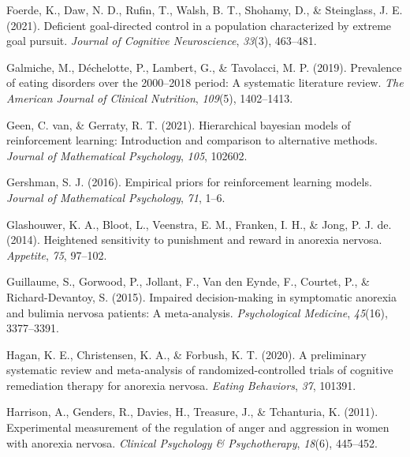 \documentclass[
  man,floatsintext]{apa6}
\newlength{\cslhangindent}
\newlength{\cslentryspacingunit} %
\newenvironment{CSLReferences}[2] %
 {%
  \setlength{\parindent}{0pt}
  \ifodd #1
  \let\oldpar\par
  \def\par{\hangindent=\cslhangindent\oldpar}
  \fi
  \setlength{\parskip}{#2\cslentryspacingunit}
 }%
 {}
\begin{document}
\begin{CSLReferences}{1}{0}
\leavevmode{}%
Foerde, K., Daw, N. D., Rufin, T., Walsh, B. T., Shohamy, D., \& Steinglass, J. E. (2021). Deficient goal-directed control in a population characterized by extreme goal pursuit. \emph{Journal of Cognitive Neuroscience}, \emph{33}(3), 463--481.

\leavevmode{}%
Galmiche, M., Déchelotte, P., Lambert, G., \& Tavolacci, M. P. (2019). Prevalence of eating disorders over the 2000--2018 period: A systematic literature review. \emph{The American Journal of Clinical Nutrition}, \emph{109}(5), 1402--1413.

\leavevmode{}%
Geen, C. van, \& Gerraty, R. T. (2021). Hierarchical bayesian models of reinforcement learning: Introduction and comparison to alternative methods. \emph{Journal of Mathematical Psychology}, \emph{105}, 102602.

\leavevmode{}%
Gershman, S. J. (2016). Empirical priors for reinforcement learning models. \emph{Journal of Mathematical Psychology}, \emph{71}, 1--6.

\leavevmode{}%
Glashouwer, K. A., Bloot, L., Veenstra, E. M., Franken, I. H., \& Jong, P. J. de. (2014). Heightened sensitivity to punishment and reward in anorexia nervosa. \emph{Appetite}, \emph{75}, 97--102.

\leavevmode{}%
Guillaume, S., Gorwood, P., Jollant, F., Van den Eynde, F., Courtet, P., \& Richard-Devantoy, S. (2015). Impaired decision-making in symptomatic anorexia and bulimia nervosa patients: A meta-analysis. \emph{Psychological Medicine}, \emph{45}(16), 3377--3391.

\leavevmode{}%
Hagan, K. E., Christensen, K. A., \& Forbush, K. T. (2020). A preliminary systematic review and meta-analysis of randomized-controlled trials of cognitive remediation therapy for anorexia nervosa. \emph{Eating Behaviors}, \emph{37}, 101391.

\leavevmode{}%
Harrison, A., Genders, R., Davies, H., Treasure, J., \& Tchanturia, K. (2011). Experimental measurement of the regulation of anger and aggression in women with anorexia nervosa. \emph{Clinical Psychology \& Psychotherapy}, \emph{18}(6), 445--452.


\end{CSLReferences}
\end{document}
